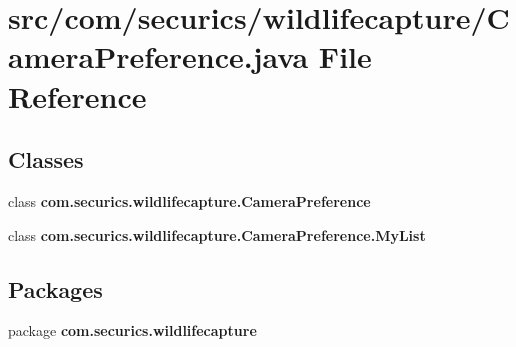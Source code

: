 \section{src/com/securics/wildlifecapture/\+Camera\+Preference.java File Reference}
\label{_camera_preference_8java}
\subsection*{Classes}
\begin{DoxyCompactItemize}
\item 
class {\bf com.\+securics.\+wildlifecapture.\+Camera\+Preference}
\item 
class {\bf com.\+securics.\+wildlifecapture.\+Camera\+Preference.\+My\+List}
\end{DoxyCompactItemize}
\subsection*{Packages}
\begin{DoxyCompactItemize}
\item 
package {\bf com.\+securics.\+wildlifecapture}
\end{DoxyCompactItemize}
